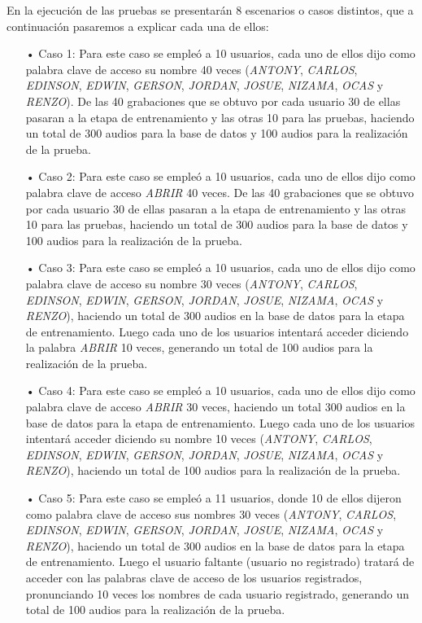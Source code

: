 En la ejecución de las pruebas se presentarán 8 escenarios o casos distintos, que a continuación pasaremos a explicar cada una de ellos:
\begin{enumerate}
\item[•]Caso 1: Para este caso se empleó a 10 usuarios, cada uno de ellos dijo como palabra clave de acceso su nombre 40 veces (\textit{ANTONY}, \textit{CARLOS}, \textit{EDINSON}, \textit{EDWIN}, \textit{GERSON}, \textit{JORDAN}, \textit{JOSUE}, \textit{NIZAMA}, \textit{OCAS} y \textit{RENZO}). De las 40 grabaciones que se obtuvo por cada usuario 30 de ellas pasaran a la etapa de entrenamiento y las otras 10 para las pruebas, haciendo un total de 300 audios para la base de datos y 100 audios para la realización de la prueba.
\item[•]Caso 2: Para este caso se empleó a 10 usuarios, cada uno de ellos dijo como palabra clave de acceso \textit{ABRIR} 40 veces. De las 40 grabaciones que se obtuvo por cada usuario 30 de ellas pasaran a la etapa de entrenamiento y las otras 10 para las pruebas, haciendo un total de 300 audios para la base de datos y 100 audios para la realización de la prueba.
\item[•]Caso 3: Para este caso se empleó a 10 usuarios, cada uno de ellos dijo como palabra clave de acceso su nombre 30 veces (\textit{ANTONY}, \textit{CARLOS}, \textit{EDINSON}, \textit{EDWIN}, \textit{GERSON}, \textit{JORDAN}, \textit{JOSUE}, \textit{NIZAMA}, \textit{OCAS} y \textit{RENZO}), haciendo un total de 300 audios en la base de datos para la etapa de entrenamiento. Luego cada uno de los usuarios intentará acceder diciendo la palabra \textit{ABRIR} 10 veces, generando un total de 100 audios para la realización de la prueba.
\item[•]Caso 4: Para este caso se empleó a 10 usuarios, cada uno de ellos dijo como palabra clave de acceso \textit{ABRIR} 30 veces, haciendo un total 300 audios en la base de datos para la etapa de entrenamiento. Luego cada uno de los usuarios intentará acceder diciendo su nombre 10 veces (\textit{ANTONY}, \textit{CARLOS}, \textit{EDINSON}, \textit{EDWIN}, \textit{GERSON}, \textit{JORDAN}, \textit{JOSUE}, \textit{NIZAMA}, \textit{OCAS} y \textit{RENZO}), haciendo un total de 100 audios para la realización de la prueba.
\item[•]Caso 5: Para este caso se empleó a 11 usuarios, donde 10 de ellos dijeron como palabra clave de acceso sus nombres 30 veces (\textit{ANTONY}, \textit{CARLOS}, \textit{EDINSON}, \textit{EDWIN}, \textit{GERSON}, \textit{JORDAN}, \textit{JOSUE}, \textit{NIZAMA}, \textit{OCAS} y \textit{RENZO}), haciendo un total de 300 audios en la base de datos para la etapa de entrenamiento. Luego el usuario faltante (usuario no registrado) tratará de acceder con las palabras clave de acceso de los usuarios registrados, pronunciando 10 veces los nombres de cada usuario registrado, generando un total de 100 audios para la realización de la prueba.

\end{enumerate}
